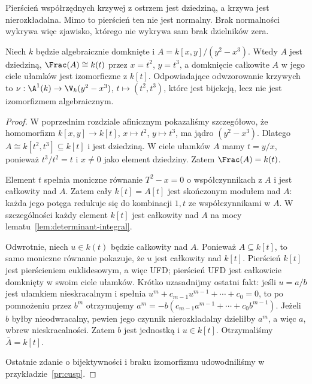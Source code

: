 \begin{uwaga}
Pierścień współrzędnych krzywej z ostrzem jest dziedziną,
a krzywa jest nierozkładalna. Mimo to pierścień ten
nie jest normalny. Brak normalności wykrywa więc
zjawisko, którego nie wykrywa sam brak dzielników zera.
\end{uwaga}

\begin{twierdzenie}
\label{tw:normalize-cusp}
Niech $k$ będzie algebraicznie domknięte i
$A=k[x,y]/(y^2-x^3)$. Wtedy $A$ jest dziedziną,
$\Frac(A)\cong k(t)$ przez $x=t^2$, $y=t^3$,
a domknięcie całkowite $A$ w jego ciele ułamków jest
izomorficzne z $k[t]$. Odpowiadające odwzorowanie
krzywych to $\nu:\A^1(k)\to\V_k(y^2-x^3)$,
$t\mapsto(t^2,t^3)$, które jest bijekcją, lecz nie jest
izomorfizmem algebraicznym.
\end{twierdzenie}
\begin{proof}
W poprzednim rozdziale afinicznym pokazaliśmy szczegółowo,
że homomorfizm $k[x,y]\to k[t]$,
$x\mapsto t^2$, $y\mapsto t^3$, ma jądro $(y^2-x^3)$.
Dlatego $A\cong k[t^2,t^3]\subseteq k[t]$ i jest dziedziną.
W ciele ułamków $A$ mamy $t=y/x$, ponieważ
$t^3/t^2=t$ i $x\ne0$ jako element dziedziny.
Zatem $\Frac(A)=k(t)$.

Element $t$ spełnia moniczne równanie $T^2-x=0$
o współczynnikach z $A$ i jest całkowity nad $A$.
Zatem cały $k[t]=A[t]$ jest skończonym modułem nad $A$:
każda jego potęga redukuje się do kombinacji
$1,t$ ze współczynnikami w $A$.
W szczególności każdy element $k[t]$ jest całkowity nad $A$
na mocy lematu~\ref{lem:determinant-integral}.

Odwrotnie, niech $u\in k(t)$ będzie całkowity nad $A$.
Ponieważ $A\subseteq k[t]$, to samo moniczne równanie
pokazuje, że $u$ jest całkowity nad $k[t]$.
Pierścień $k[t]$ jest pierścieniem euklidesowym, a więc
UFD; pierścień UFD jest całkowicie domknięty w swoim
ciele ułamków. Krótko uzasadnijmy ostatni fakt:
jeśli $u=a/b$ jest ułamkiem nieskracalnym i spełnia
$u^m+c_{m-1}u^{m-1}+\cdots+c_0=0$, to po pomnożeniu
przez $b^m$ otrzymujemy
$a^m=-b(c_{m-1}a^{m-1}+\cdots+c_0b^{m-1})$.
Jeżeli $b$ byłby nieodwracalny, pewien jego czynnik
nierozkładalny dzieliłby $a^m$, a więc $a$, wbrew
nieskracalności. Zatem $b$ jest jednostką i $u\in k[t]$.
Otrzymaliśmy $\overline A=k[t]$.

Ostatnie zdanie o bijektywności i braku izomorfizmu
udowodniliśmy w przykładzie~\ref{pr:cusp}.
\end{proof}

